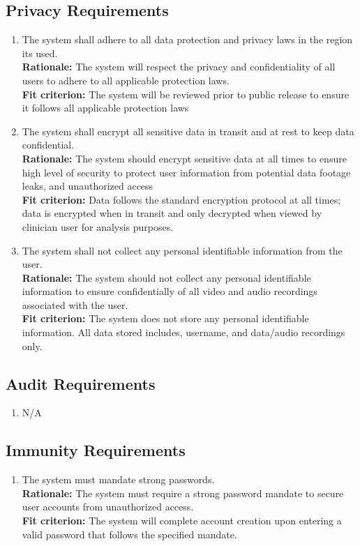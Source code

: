 \documentclass[12pt]{article}
\begin{document}
\subsection{Privacy Requirements}
\begin{enumerate}[{SR-P}1. ]
  \item The system shall adhere to all data protection and privacy laws in the region its used.\\
  \textbf{Rationale: }The system will respect the privacy and confidentiality of all users to adhere to all applicable protection laws.\\
  \textbf{Fit criterion: }The system will be reviewed prior to public release to ensure it follows all applicable protection laws
  \item The system shall encrypt all sensitive data in transit and at rest to keep data confidential.\\
  \textbf{Rationale: }The system should encrypt sensitive data at all times to ensure high level of security to protect user information from potential data footage leaks, and unauthorized access \\
  \textbf{Fit criterion: }Data follows the standard encryption protocol at all times; data is encrypted when in transit and only decrypted when viewed by clinician user for analysis purposes.
  \item The system shall not collect any personal identifiable information from the user.\\
  \textbf{Rationale: }The system should not collect any personal identifiable information to ensure confidentially of all video and audio recordings associated with the user. \\
  \textbf{Fit criterion: }The system does not store any personal identifiable information. All data stored includes, username, and data/audio recordings only. 
\end{enumerate}
\subsection{Audit Requirements}
\begin{enumerate}[{SR-AU}1. ]
  \item N/A
\end{enumerate}
\subsection{Immunity Requirements}
\begin{enumerate}[{SR-IM}1. ]
  \item The system must mandate strong passwords.\\
  \textbf{Rationale: }The system must require a strong password mandate to secure user accounts from unauthorized access.\\
  \textbf{Fit criterion: }The system will complete account creation upon entering a valid password that follows the specified mandate. 
\end{enumerate}
\end{document}
